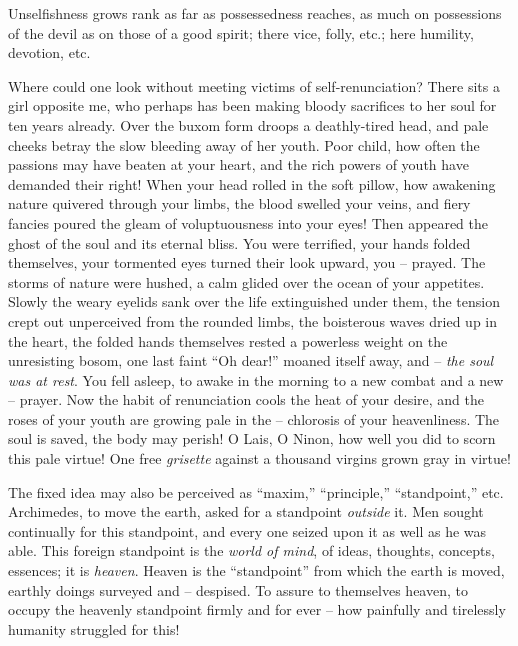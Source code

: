 Unselfishness grows rank as far as possessedness reaches, as much on 
possessions of the devil as on those of a good spirit; there vice, folly, 
etc.; here humility, devotion, etc.

Where could one look without meeting victims of self-renunciation? There sits 
a girl opposite me, who perhaps has been making bloody sacrifices to her soul 
for ten years already. Over the buxom form droops a deathly-tired head, and 
pale cheeks betray the slow bleeding away of her youth. Poor child, how often 
the passions may have beaten at your heart, and the rich powers of youth have 
demanded their right! When your head rolled in the soft pillow, how awakening 
nature quivered through your limbs, the blood swelled your veins, and fiery 
fancies poured the gleam of voluptuousness into your eyes! Then appeared the 
ghost of the soul and its eternal bliss. You were terrified, your hands folded 
themselves, your tormented eyes turned their look upward, you -- prayed. The 
storms of nature were hushed, a calm glided over the ocean of your appetites. 
Slowly the weary eyelids sank over the life extinguished under them, the 
tension crept out unperceived from the rounded limbs, the boisterous waves 
dried up in the heart, the folded hands themselves rested a powerless weight 
on the unresisting bosom, one last faint ``Oh dear!'' moaned itself away, 
and -- \textit{the soul was at rest}. You fell asleep, to awake in the morning 
to a new combat and a new -- prayer. Now the habit of renunciation cools the 
heat of your desire, and the roses of your youth are growing pale in the -- 
chlorosis of your heavenliness. The soul is saved, the body may perish! O 
Lais, O Ninon, how well you did to scorn this pale virtue! One free 
\textit{grisette} against a thousand virgins grown gray in virtue!

The fixed idea may also be perceived as ``maxim,'' ``principle,'' 
``standpoint,'' etc. Archimedes, to move the earth, asked for a standpoint 
\textit{outside} it. Men sought continually for this standpoint, and every one 
seized upon it as well as he was able. This foreign standpoint is the 
\textit{world of mind}, of ideas, thoughts, concepts, essences; it is 
\textit{heaven}. Heaven is the ``standpoint'' from which the earth is moved, 
earthly doings surveyed and -- despised. To assure to themselves heaven, to 
occupy the heavenly standpoint firmly and for ever -- how painfully and 
tirelessly humanity struggled for this!

